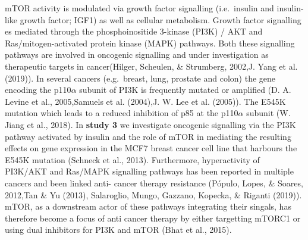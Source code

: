 \documentclass[12pt,openany]{book}
\begin{document}
mTOR activity is modulated via growth factor signalling (i.e.~insulin
and insulin-like growth factor; IGF1) as well as cellular metabolism.
Growth factor signalling es mediated through the phosphoinositide
3-kinase (PI3K) / AKT and Ras/mitogen-activated protein kinase (MAPK)
pathways. Both these signalling pathways are involved in oncogenic
signalling and under investigation as therapeutic targets in
cancer(Hilger, Scheulen, \& Strumberg, 2002,J. Yang et al. (2019)). In
several cancers (e.g.~breast, lung, prostate and colon) the gene
encoding the p110\(\alpha\) subunit of PI3K is frequently mutated or
amplified (D. A. Levine et al., 2005,Samuels et al. (2004),J. W. Lee et
al. (2005)). The E545K mutation which leads to a reduced inhibition of
p85 at the p110\(\alpha\) subunit (W. Jiang et al., 2018). In
\textbf{study 3} we investigate oncogenic signalling via the PI3K
pathway activated by insulin and the role of mTOR in mediating the
resulting effects on gene expression in the MCF7 breast cancer cell line
that harbours the E545K mutation (Schneck et al., 2013). Furthermore,
hyperactivity of PI3K/AKT and Ras/MAPK signalling pathways has been
reported in multiple cancers and been linked anti- cancer therapy
resistance (Pópulo, Lopes, \& Soares, 2012,Tan \& Yu (2013), Salaroglio,
Mungo, Gazzano, Kopecka, \& Riganti (2019)). mTOR, as a downstream actor
of these pathways integrating their singals, has therefore become a
focus of anti cancer therapy by either targetting mTORC1 or using dual
inhibitors for PI3K and mTOR (Bhat et al., 2015).
\end{document}
